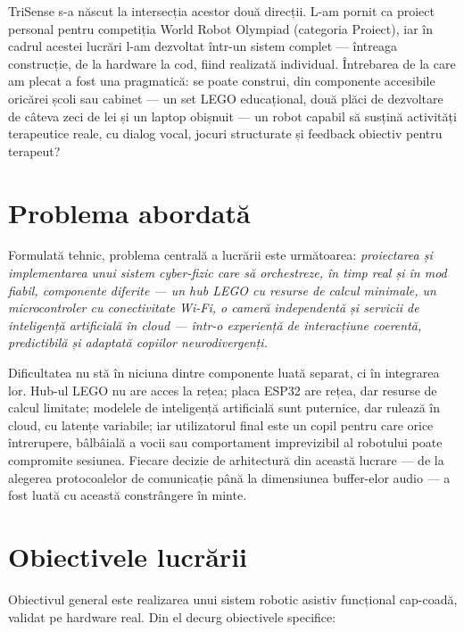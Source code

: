 TriSense s-a născut la intersecția acestor două direcții. L-am pornit ca proiect personal pentru competiția World Robot Olympiad (categoria Proiect), iar în cadrul acestei lucrări l-am dezvoltat într-un sistem complet — întreaga construcție, de la hardware la cod, fiind realizată individual. Întrebarea de la care am plecat a fost una pragmatică: se poate construi, din componente accesibile oricărei școli sau cabinet — un set LEGO educațional, două plăci de dezvoltare de câteva zeci de lei și un laptop obișnuit — un robot capabil să susțină activități terapeutice reale, cu dialog vocal, jocuri structurate și feedback obiectiv pentru terapeut?

\section{Problema abordată}

Formulată tehnic, problema centrală a lucrării este următoarea: \emph{proiectarea și implementarea unui sistem cyber-fizic care să orchestreze, în timp real și în mod fiabil, componente diferite — un hub LEGO cu resurse de calcul minimale, un microcontroler cu conectivitate Wi-Fi, o cameră independentă și servicii de inteligență artificială în cloud — într-o experiență de interacțiune coerentă, predictibilă și adaptată copiilor neurodivergenți.}

Dificultatea nu stă în niciuna dintre componente luată separat, ci în integrarea lor. Hub-ul LEGO nu are acces la rețea; placa ESP32 are rețea, dar resurse de calcul limitate; modelele de inteligență artificială sunt puternice, dar rulează în cloud, cu latențe variabile; iar utilizatorul final este un copil pentru care orice întrerupere, bâlbâială a vocii sau comportament imprevizibil al robotului poate compromite sesiunea. Fiecare decizie de arhitectură din această lucrare — de la alegerea protocoalelor de comunicație până la dimensiunea buffer-elor audio — a fost luată cu această constrângere în minte.

\section{Obiectivele lucrării}

Obiectivul general este realizarea unui sistem robotic asistiv funcțional cap-coadă, validat pe hardware real. Din el decurg obiectivele specifice:

